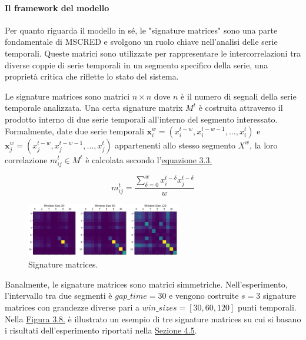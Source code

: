    \paragraph{Il framework del modello}
    Per quanto riguarda il modello in sé, le "signature matrices" sono una parte fondamentale di MSCRED e svolgono un 
    ruolo chiave nell'analisi delle serie temporali. Queste matrici sono utilizzate per rappresentare le intercorrelazioni
    tra diverse coppie di serie temporali in un segmento specifico della serie, una proprietà critica che riflette lo
    stato del sistema.
    

    Le signature matrices sono matrici $n \times n$ dove $n$ è il numero di segnali della serie temporale analizzata.
    Una certa signature matrix $M^t$ è costruita attraverso il prodotto interno di due serie temporali all'interno del segmento 
    interessato. Formalmente, date due serie temporali $\mathbf{x}^w_i = (x^{t-w}_i, x^{t-w-1}_i, \dots, x_i^t)$ e $\mathbf{x}_j^w =
    (x_j^{t-w}, x_j^{t-w-1}, \dots, x_j^t)$ appartenenti allo stesso segmento $X^w$, la loro correlazione $m_{ij}^t \in M^t$ è 
    calcolata secondo l'\hyperref[eq:sign-matr]{equazione 3.3.}

    \begin{equation}\label{eq:sign-matr}
        m_{ij}^t =\frac{\sum_{\delta=0}^w x_i^{t-\delta}x_j^{t-\delta}}{w}
    \end{equation}
            
    \begin{figure}[H]
        \centering
        \includegraphics[width=0.6\textwidth]{./input/chapters/models/figs/signature_matrices.png}
        \caption{Signature matrices.} %
        \label{fig:signature-matrices}
    \end{figure}

    Banalmente, le signature matrices sono matrici simmetriche. Nell'esperimento, l'intervallo tra due segmenti è 
    $gap\_time = 30$ e vengono costruite $s=3$ signature matrices con grandezze diverse pari a $win\_sizes = [30, 60, 120]$ punti
    temporali.
    Nella \hyperref[fig:signature-matrices]{Figura 3.8.} è illustrato un esempio di tre signature matrices su cui si
    basano i risultati dell'esperimento riportati nella \hyperref[val-mscred]{Sezione 4.5}.

